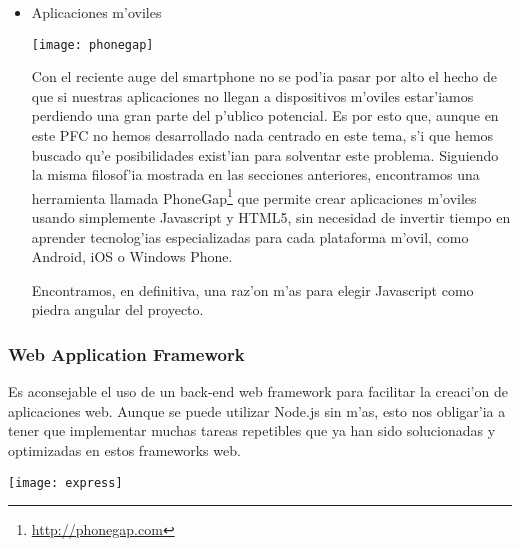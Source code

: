 \begin{itemize}
Otro punto a favor de Node.js es su gestor de paquetes NPM, con el cual se puede instalar cualquier extensi'on para back-end que exista en el repositorio
de forma r'apida y sencilla. Como se ha mencionado antes, Node.js est'a teniendo un crecimiento extremadamente r'apido, de forma que el n'umero
de m'odulos existentes para esta tecnolog'ia est'a superando a otros gigantes del sector en muy poco tiempo de vida\footnote{\url{http://modulecounts.com/}}.
Pero, sobretodo, lo m'as importante es que el tiempo que se invierte en la programaci'on de front o back-end
tambi'en nos da experiencia en la otra parte, puesto que siempre estamos usando el mismo lenguaje.

\item Aplicaciones m'oviles
\begin{center}
\texttt{[image: phonegap]}
\end{center}

Con el reciente auge del smartphone no se pod'ia pasar por alto el hecho de que si nuestras aplicaciones no llegan a dispositivos m'oviles
estar'iamos perdiendo una gran parte del p'ublico potencial. Es por esto que, aunque en este PFC no hemos desarrollado nada centrado en
este tema, s'i que hemos buscado qu'e posibilidades exist'ian para solventar este problema. Siguiendo la misma filosof'ia mostrada en las
secciones anteriores, encontramos una herramienta llamada PhoneGap\footnote{\url{http://phonegap.com}} que permite crear aplicaciones m'oviles usando simplemente Javascript y
HTML5, sin necesidad de invertir tiempo en aprender tecnolog'ias especializadas para cada plataforma m'ovil, como Android, iOS o Windows Phone.

Encontramos, en definitiva, una raz'on m'as para elegir Javascript como piedra angular del proyecto.


\end{itemize}


\subsubsection{Web Application Framework}
\label{sub:web_application_framework}
Es aconsejable el uso de un back-end web framework para facilitar la creaci'on de aplicaciones web. Aunque se puede utilizar Node.js sin m'as,
esto nos obligar'ia a tener que implementar muchas tareas repetibles que ya han sido solucionadas y optimizadas en estos frameworks web.

\begin{center}
\texttt{[image: express]}
\end{center}

